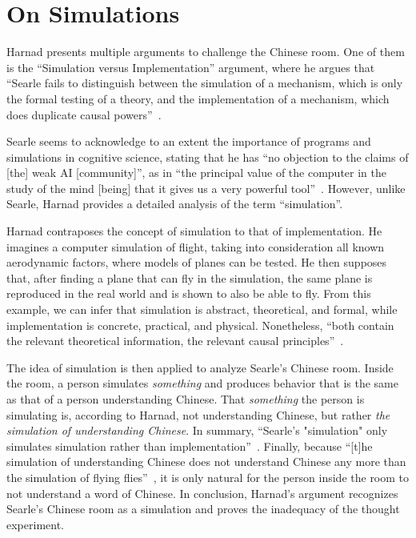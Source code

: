 \section{On Simulations}
\label{sec:simulations}

Harnad presents multiple arguments to challenge the Chinese room. One of them is the ``Simulation versus Implementation'' argument, where he argues that ``Searle fails to distinguish between the simulation of a mechanism, which is only the formal testing of a theory, and the implementation of a mechanism, which does duplicate causal powers''~\cite[p.~12]{harnad1989minds}.

Searle seems to acknowledge to an extent the importance of programs and simulations in cognitive science, stating that he has ``no objection to the claims of [the] weak AI [community]'', as in ``the principal value of the computer in the study of the mind [being] that it gives us a very powerful tool''~\cite[p.~417]{searle1980minds}. However, unlike Searle, Harnad provides a detailed analysis of the term ``simulation''.

Harnad contraposes the concept of simulation to that of implementation. He imagines a computer simulation of flight, taking into consideration all known aerodynamic factors, where models of planes can be tested. He then supposes that, after finding a plane that can fly in the simulation, the same plane is reproduced in the real world and is shown to also be able to fly. From this example, we can infer that simulation is abstract, theoretical, and formal, while implementation is concrete, practical, and physical. Nonetheless, ``both contain the relevant theoretical information, the relevant causal principles''~\cite[p.~2]{harnad1989minds}.

The idea of simulation is then applied to analyze Searle's Chinese room. Inside the room, a person simulates \textit{something} and produces behavior that is the same as that of a person understanding Chinese. That \textit{something} the person is simulating is, according to Harnad, not understanding Chinese, but rather \textit{the simulation of understanding Chinese}. In summary, ``Searle's "simulation" only simulates simulation rather than implementation''~\cite[p.~12]{harnad1989minds}. Finally, because ``[t]he simulation of understanding Chinese does not understand Chinese any more than the simulation of flying flies''~\cite[p.~4]{harnad1989minds}, it is only natural for the person inside the room to not understand a word of Chinese. In conclusion, Harnad's argument recognizes Searle's Chinese room as a simulation and proves the inadequacy of the thought experiment.


